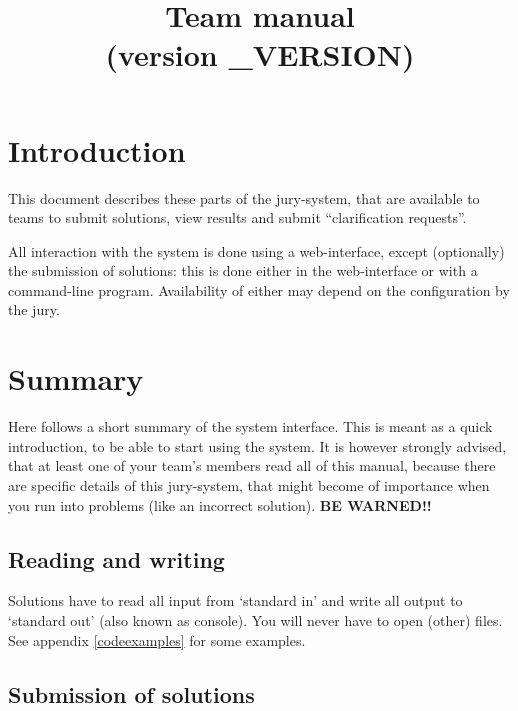 

\usepackage[english]{babel}

\title{Team manual \DOMjudge\\(version \DOMJUDGE_VERSION)}



\domjudgetitlepage

\newpage
\tableofcontents

\newpage
\section{Introduction}

This document describes these parts of the \DOMjudge jury-system, that
are available to teams to submit solutions, view results and submit
``clarification requests''.

All interaction with the system is done using a web-interface, except
(optionally) the submission of solutions: this is done either in the
web-interface or with a command-line program. Availability of either
may depend on the configuration by the jury.

\section{Summary}

Here follows a short summary of the system interface. This is meant as
a quick introduction, to be able to start using the system. It is
however strongly advised, that at least one of your team's members
read all of this manual, because there are specific details of this
jury-system, that might become of importance when you run into
problems (like an incorrect solution). \textbf{BE WARNED!!}

\subsection{Reading and writing}

Solutions have to read all input from `standard in' and write all
output to `standard out' (also known as console). You will never have
to open (other) files. See appendix \ref{codeexamples} for some
examples.

\subsection{Submission of solutions}

